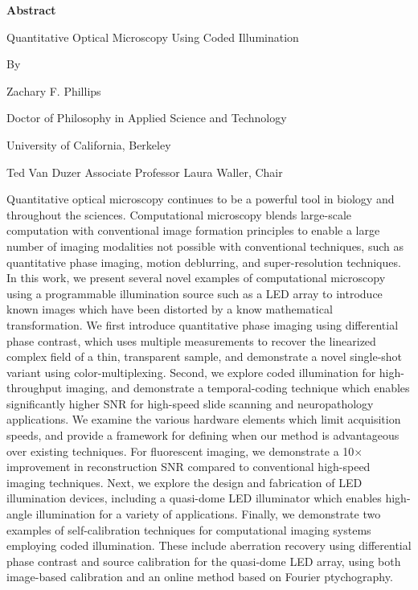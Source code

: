 \begin{center}
    \textbf{Abstract}
    
    \vspace{1.2cm}
     Quantitative Optical Microscopy Using Coded Illumination
 
    \vspace{0.4cm}
    
    By
 
    \vspace{0.4cm}
    Zachary F. Phillips
    
     \vspace{0.4cm}
     Doctor of Philosophy in Applied Science and Technology
     
     \vspace{0.4cm}
     University of California, Berkeley
     
     \vspace{0.4cm}
     Ted Van Duzer Associate Professor Laura Waller, Chair
 
    \vspace{0.8cm}

    
\end{center}

Quantitative optical microscopy continues to be a powerful tool in biology and throughout the sciences. Computational microscopy blends large-scale computation with conventional image formation principles to enable a large number of imaging modalities not possible with conventional techniques, such as quantitative phase imaging, motion deblurring, and super-resolution techniques. In this work, we present several novel examples of computational microscopy using a programmable illumination source such as a LED array to introduce known images which have been distorted by a know mathematical transformation. We first introduce quantitative phase imaging using differential phase contrast, which uses multiple measurements to recover the linearized complex field of a thin, transparent sample, and demonstrate a novel single-shot variant using color-multiplexing. Second, we explore coded illumination for high-throughput imaging, and demonstrate a temporal-coding technique which enables significantly higher SNR for high-speed slide scanning and neuropathology applications. We examine the various hardware elements which limit acquisition speeds, and provide a framework for defining when our method is advantageous over existing techniques. For fluorescent imaging, we demonstrate a 10$\times$ improvement in reconstruction SNR compared to conventional high-speed imaging techniques. Next, we explore the design and fabrication of LED illumination devices, including a quasi-dome LED illuminator which enables high-angle illumination for a variety of applications. Finally, we demonstrate two examples of self-calibration techniques for computational imaging systems employing coded illumination. These include aberration recovery using differential phase contrast and source calibration for the quasi-dome LED array, using both image-based calibration and an online method based on Fourier ptychography.